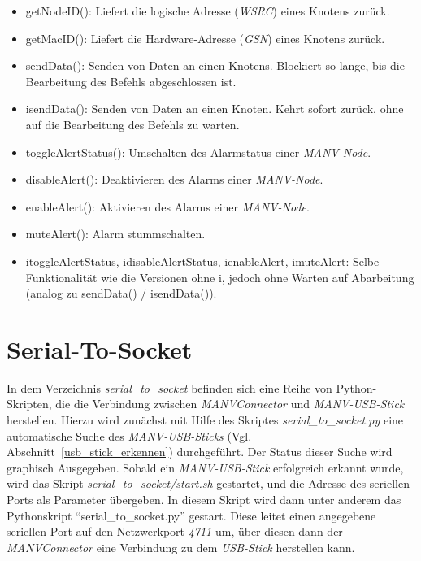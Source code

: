     \begin{itemize}
        \item{getNodeID():} Liefert die logische Adresse (\emph{WSRC}) eines Knotens zurück.
        \item{getMacID():} Liefert die Hardware-Adresse (\emph{GSN}) eines Knotens zurück.
        \item{sendData():} Senden von Daten an einen Knotens. Blockiert so lange, bis die Bearbeitung des
                           Befehls abgeschlossen ist.
        \item{isendData():} Senden von Daten an einen Knoten. Kehrt sofort zurück, ohne auf die Bearbeitung
                            des Befehls zu warten.
        \item{toggleAlertStatus():} Umschalten des Alarmstatus einer \emph{MANV-Node}.
        \item{disableAlert():} Deaktivieren des Alarms einer \emph{MANV-Node}.
        \item{enableAlert():} Aktivieren des Alarms einer \emph{MANV-Node}.
        \item{muteAlert():} Alarm stummschalten.
        \item{itoggleAlertStatus, idisableAlertStatus, ienableAlert, imuteAlert}: Selbe Funktionalität
            wie die Versionen ohne i, jedoch ohne Warten auf Abarbeitung (analog zu sendData() / isendData()).
    \end{itemize}

    \section{Serial-To-Socket}

    In dem Verzeichnis \emph{serial\_to\_socket} befinden sich eine Reihe von Python-Skripten, die die
    Verbindung zwischen \emph{MANVConnector} und \emph{MANV-USB-Stick} herstellen. Hierzu 
    wird zunächst mit Hilfe des Skriptes \emph{serial\_to\_socket.py} eine automatische Suche des
    \emph{MANV-USB-Sticks} (Vgl. Abschnitt~\ref{usb_stick_erkennen}) durchgeführt. Der Status
    dieser Suche wird graphisch Ausgegeben. Sobald ein \emph{MANV-USB-Stick} erfolgreich
    erkannt wurde, wird das Skript \emph{serial\_to\_socket/start.sh} gestartet, und die
    Adresse des seriellen Ports als Parameter übergeben. In diesem Skript wird
    dann unter anderem das Pythonskript "`serial\_to\_socket.py"' gestart. Diese leitet einen
    angegebene seriellen Port auf den Netzwerkport \emph{4711} um, über diesen dann der
    \emph{MANVConnector} eine Verbindung zu dem \emph{USB-Stick} herstellen kann.
    
